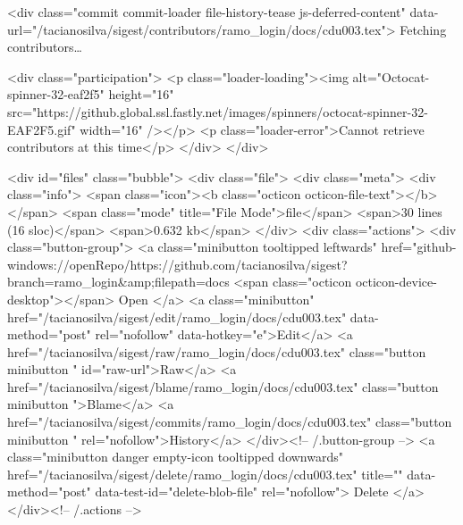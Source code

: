   <div class="commit commit-loader file-history-tease js-deferred-content" data-url="/tacianosilva/sigest/contributors/ramo_login/docs/cdu003.tex">
    Fetching contributors…

    <div class="participation">
      <p class="loader-loading"><img alt="Octocat-spinner-32-eaf2f5" height="16" src="https://github.global.ssl.fastly.net/images/spinners/octocat-spinner-32-EAF2F5.gif" width="16" /></p>
      <p class="loader-error">Cannot retrieve contributors at this time</p>
    </div>
  </div>

<div id="files" class="bubble">
  <div class="file">
    <div class="meta">
      <div class="info">
        <span class="icon"><b class="octicon octicon-file-text"></b></span>
        <span class="mode" title="File Mode">file</span>
          <span>30 lines (16 sloc)</span>
        <span>0.632 kb</span>
      </div>
      <div class="actions">
        <div class="button-group">
            <a class="minibutton tooltipped leftwards"
               href="github-windows://openRepo/https://github.com/tacianosilva/sigest?branch=ramo_login&amp;filepath=docs%
                <span class="octicon octicon-device-desktop"></span> Open
            </a>
                <a class="minibutton"
                   href="/tacianosilva/sigest/edit/ramo_login/docs/cdu003.tex"
                   data-method="post" rel="nofollow" data-hotkey="e">Edit</a>
          <a href="/tacianosilva/sigest/raw/ramo_login/docs/cdu003.tex" class="button minibutton " id="raw-url">Raw</a>
            <a href="/tacianosilva/sigest/blame/ramo_login/docs/cdu003.tex" class="button minibutton ">Blame</a>
          <a href="/tacianosilva/sigest/commits/ramo_login/docs/cdu003.tex" class="button minibutton " rel="nofollow">History</a>
        </div><!-- /.button-group -->
          <a class="minibutton danger empty-icon tooltipped downwards"
             href="/tacianosilva/sigest/delete/ramo_login/docs/cdu003.tex"
             title=""
             data-method="post" data-test-id="delete-blob-file" rel="nofollow">
          Delete
        </a>
      </div><!-- /.actions -->

